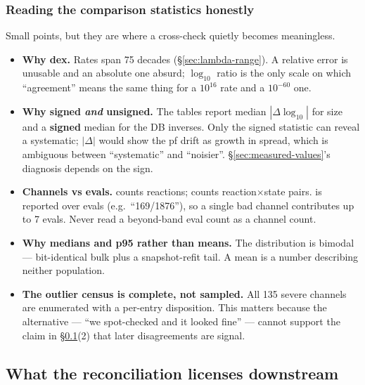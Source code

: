 \subsubsection{Reading the comparison statistics honestly}
\label{sec:reading-stats}

Small points, but they are where a cross-check quietly becomes meaningless.

\begin{itemize}
\item \textbf{Why dex.} Rates span 75 decades (\S\ref{sec:lambda-range}). A
      relative error is unusable and an absolute one absurd; $\log_{10}$ ratio
      is the only scale on which ``agreement'' means the same thing for a
      $10^{16}$ rate and a $10^{-60}$ one.
\item \textbf{Why signed \emph{and} unsigned.} The tables report median
      $|\Delta\log_{10}|$ for size and a \textbf{signed} median for the DB
      inverses. Only the signed statistic can reveal a systematic; $|\Delta|$
      would show the pf drift as growth in spread, which is ambiguous between
      ``systematic'' and ``noisier''. \S\ref{sec:measured-values}'s diagnosis
      depends on the sign.
\item \textbf{Channels vs evals.}  counts reactions;
       counts reaction$\times$state pairs.  is
      reported over evals (e.g.\ ``169/1876''), so a single bad channel
      contributes up to 7 evals. Never read a beyond-band eval count as a
      channel count.
\item \textbf{Why medians and p95 rather than means.} The distribution is
      bimodal --- bit-identical bulk plus a snapshot-refit tail. A mean is a
      number describing neither population.
\item \textbf{The outlier census is complete, not sampled.} All 135 severe
      channels are enumerated with a per-entry disposition. This matters because
      the alternative --- ``we spot-checked and it looked fine'' --- cannot
      support the claim in \S\ref{sec:licenses}(2) that later disagreements are
      signal.
\end{itemize}

\subsection{What the reconciliation licenses downstream}
\label{sec:licenses}

